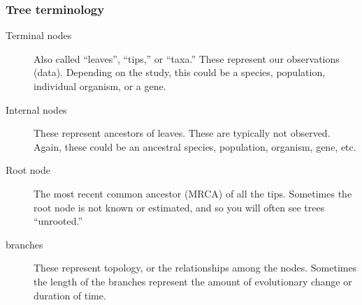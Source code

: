 \begin{frame}
    \frametitle{Tree terminology}
    \begin{description}
        \item[Terminal nodes]
            Also called ``leaves'', ``tips,'' or ``taxa.''
            These represent our observations (data).
            Depending on the study, this could be a species, population,
            individual organism, or a gene.
        \item[Internal nodes]
            These represent ancestors of leaves.
            These are typically not observed.
            Again, these could be an ancestral species, population,
            organism, gene, etc.
        \item[Root node]
            The most recent common ancestor (MRCA) of all the tips.  Sometimes
            the root node is not known or estimated, and so you will often see
            trees ``unrooted.''
        \item[branches]
            These represent topology, or the relationships among the nodes.
            Sometimes the length of the branches represent the amount of
            evolutionary change or duration of time.
    \end{description}
\end{frame}

